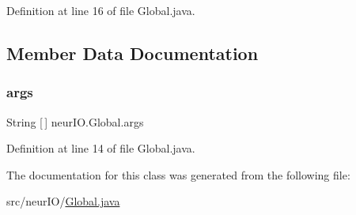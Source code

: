 Definition at line 16 of file Global.\+java.



\subsection{Member Data Documentation}
\mbox{\label{classneur_i_o_1_1_global_a3c6209cd45e77078a54b91b9a4f4f677}} 
\subsubsection{\texorpdfstring{args}{args}}
{\footnotesize\ttfamily String \mbox{[}$\,$\mbox{]} neur\+I\+O.\+Global.\+args\hspace{0.3cm}{\ttfamily [static]}}



Definition at line 14 of file Global.\+java.



The documentation for this class was generated from the following file\+:\begin{DoxyCompactItemize}
\item 
src/neur\+I\+O/\hyperlink{_global_8java}{Global.\+java}\end{DoxyCompactItemize}
